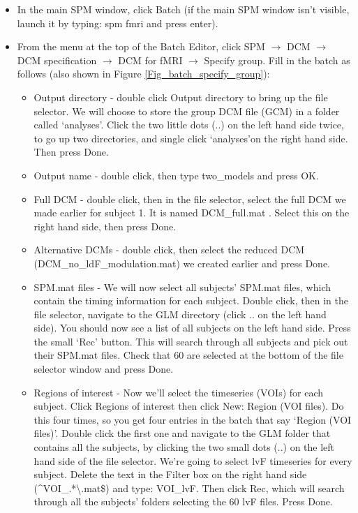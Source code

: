 \documentclass{article}
\begin{document}
\begin{itemize}

\item In the main SPM window, click Batch (if the main SPM window isn't visible, launch it by typing: spm fmri and press enter).

\item From the menu at the top of the Batch Editor, click SPM $\rightarrow$ DCM $\rightarrow$ DCM specification $\rightarrow$ DCM for fMRI $\rightarrow$ Specify group. Fill in the batch as follows (also shown in Figure \ref{Fig_batch_specify_group}):

\begin{itemize}
    

\item Output directory - double click Output directory to bring up the file selector. We will choose to store the group DCM file (GCM) in a folder called \lq analyses\rq. Click the two little dots (..) on the left hand side twice, to go up two directories, and single click \lq analyses\rq on the right hand side. Then press Done.

\item Output name - double click, then type two\_models and press OK.

\item Full DCM - double click, then in the file selector, select the full DCM we made earlier for subject 1. It is named DCM\_full.mat . Select this on the right hand side, then press Done.

\item Alternative DCMs - double click, then select the reduced DCM (DCM\_no\_ldF\_modulation.mat) we created earlier and press Done.

\item SPM.mat files - We will now select all subjects' SPM.mat files, which contain the timing information for each subject. Double click, then in the file selector, navigate to the GLM directory (click .. on the left hand side). You should now see a list of all subjects on the left hand side. Press the small `Rec' button. This will search through all subjects and pick out their SPM.mat files. Check that 60 are selected at the bottom of the file selector window and press Done.

\item Regions of interest - Now we'll select the timeseries (VOIs) for each subject. Click Regions of interest then click New: Region (VOI files). Do this four times, so you get four entries in the batch that say `Region (VOI files)'. Double click the first one and navigate to the GLM folder that contains all the subjects, by clicking the two small dots (..) on the left hand side of the file selector. We're going to select lvF timeseries for every subject. Delete the text in the Filter box on the right hand side (\textasciicircum VOI\_.*\textbackslash.mat\$) and type: VOI\_lvF. Then click Rec, which will search through all the subjects' folders selecting the 60 lvF files. Press Done.


\end{itemize}
\end{itemize}
\end{document}
